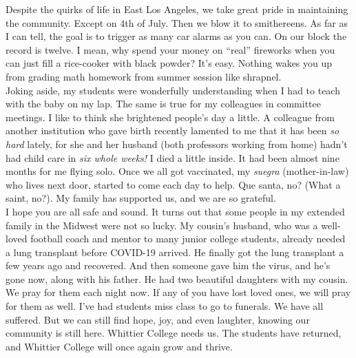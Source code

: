 \documentclass[../../main.tex]{subfiles}
\begin{document}
Despite the quirks of life in East Los Angeles, we take great pride in maintaining the community.  Except on 4th of July.  Then we blow it to smithereens.  As far as I can tell, the goal is to trigger as many car alarms as you can.  On our block the record is twelve.  I mean, why spend your money on ``real'' fireworks when you can just fill a rice-cooker with black powder?  It's easy.  Nothing wakes you up from grading math homework from summer session like shrapnel.
\\
\vspace{0.15cm}
Joking aside, my students were wonderfully understanding when I had to teach with the baby on my lap.  The same is true for my colleagues in committee meetings.  I like to think she brightened people's day a little.  A colleague from another institution who gave birth recently lamented to me that it has been \textit{so hard} lately, for she and her husband (both professors working from home) hadn't had child care in \textit{six whole weeks!}  I died a little inside.  It had been almost nine months for me flying solo.  Once we all got vaccinated, my \textit{suegra} (mother-in-law) who lives next door, started to come each day to help.  Que santa, no? (What a saint, no?).  My family has supported us, and we are so grateful.
\\
\vspace{0.15cm}
I hope you are all safe and sound.  It turns out that some people in my extended family in the Midwest were not so lucky.  My cousin's husband, who was a well-loved football coach and mentor to many junior college students, already needed a lung transplant before COVID-19 arrived.  He finally got the lung transplant a few years ago and recovered.  And then someone gave him the virus, and he's gone now, along with his father.  He had two beautiful daughters with my cousin.  We pray for them each night now.  If any of you have lost loved ones, we will pray for them as well.  I've had students miss class to go to funerals.  We have all suffered.  But we can still find hope, joy, and even laughter, knowing our community is still here.  Whittier College needs us.  The students have returned, and Whittier College will once again grow and thrive.
\end{document}
